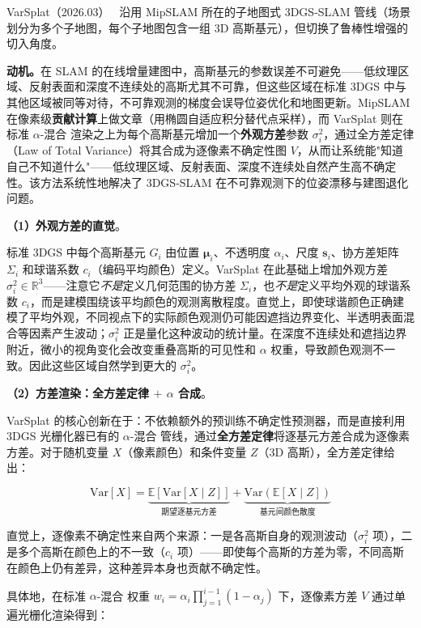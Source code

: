 VarSplat（2026.03）~\cite{2603_09673} 沿用 MipSLAM 所在的子地图式 3DGS-SLAM 管线（场景划分为多个子地图，每个子地图包含一组 3D 高斯基元），但切换了鲁棒性增强的切入角度。

\textbf{动机。}在 SLAM 的在线增量建图中，高斯基元的参数误差不可避免——低纹理区域、反射表面和深度不连续处的高斯尤其不可靠，但这些区域在标准 3DGS 中与其他区域被同等对待，不可靠观测的梯度会误导位姿优化和地图更新。MipSLAM 在像素级\textbf{贡献计算}上做文章（用椭圆自适应积分替代点采样），而 VarSplat 则在标准 $\alpha$-混合 渲染之上为每个高斯基元增加一个\textbf{外观方差}参数 $\sigma_i^2$，通过全方差定律（Law of Total Variance）将其合成为逐像素不确定性图 $V$，从而让系统能"知道自己不知道什么"——低纹理区域、反射表面、深度不连续处自然产生高不确定性。该方法系统性地解决了 3DGS-SLAM 在不可靠观测下的位姿漂移与建图退化问题。

\textbf{（1）外观方差的直觉}。

标准 3DGS 中每个高斯基元 $G_i$ 由位置 $\boldsymbol{\mu}_i$、不透明度 $\alpha_i$、尺度 $\mathbf{s}_i$、协方差矩阵 $\Sigma_i$ 和球谐系数 $c_i$（编码平均颜色）定义。VarSplat 在此基础上增加外观方差 $\sigma_i^2 \in \mathbb{R}^3$——注意它\textit{不是}定义几何范围的协方差 $\Sigma_i$，也\textit{不是}定义平均外观的球谐系数 $c_i$，而是建模围绕该平均颜色的观测离散程度。直觉上，即使球谐颜色正确建模了平均外观，不同视点下的实际颜色观测仍可能因遮挡边界变化、半透明表面混合等因素产生波动；$\sigma_i^2$ 正是量化这种波动的统计量。在深度不连续处和遮挡边界附近，微小的视角变化会改变重叠高斯的可见性和 $\alpha$ 权重，导致颜色观测不一致。因此这些区域自然学到更大的 $\sigma_i^2$。

\textbf{（2）方差渲染：全方差定律 $+$ $\alpha$ 合成}。

VarSplat 的核心创新在于：不依赖额外的预训练不确定性预测器，而是直接利用 3DGS 光栅化器已有的 $\alpha$-混合 管线，通过\textbf{全方差定律}将逐基元方差合成为逐像素方差。对于随机变量 $X$（像素颜色）和条件变量 $Z$（3D 高斯），全方差定律给出：

\begin{equation}
    \mathrm{Var}[X] = \underbrace{\mathbb{E}[\mathrm{Var}[X \mid Z]]}_{\text{期望逐基元方差}} + \underbrace{\mathrm{Var}(\mathbb{E}[X \mid Z])}_{\text{基元间颜色散度}}
\end{equation}

直觉上，逐像素不确定性来自两个来源：一是各高斯自身的观测波动（$\sigma_i^2$ 项），二是多个高斯在颜色上的不一致（$c_i$ 项）——即使每个高斯的方差为零，不同高斯在颜色上仍有差异，这种差异本身也贡献不确定性。

具体地，在标准 $\alpha$-混合 权重 $w_i = \alpha_i \prod_{j=1}^{i-1}(1-\alpha_j)$ 下，逐像素方差 $V$ 通过单遍光栅化渲染得到：

